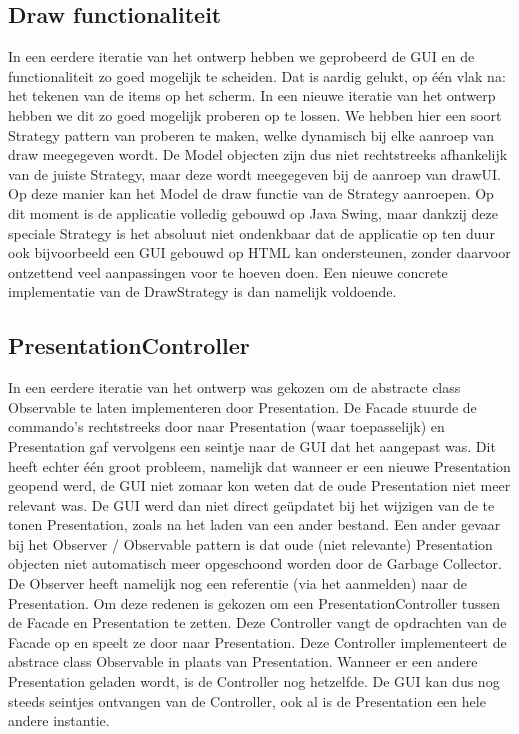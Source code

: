 \documentclass[a4paper]{article}
\newcommand{\1}[0]{\'{e}\'{e}n}
\begin{document}
\subsection{Draw functionaliteit}
\label{sub:drawFunc}
In een eerdere iteratie van het ontwerp hebben we geprobeerd de GUI en de functionaliteit zo goed mogelijk te scheiden. Dat is aardig gelukt, op \1 vlak na: het tekenen van de items op het scherm. In een nieuwe iteratie van het ontwerp hebben we dit zo goed mogelijk proberen op te lossen. We hebben hier een soort Strategy pattern van proberen te maken, welke dynamisch bij elke aanroep van draw meegegeven wordt. De Model objecten zijn dus niet rechtstreeks afhankelijk van de juiste Strategy, maar deze wordt meegegeven bij de aanroep van drawUI. Op deze manier kan het Model de draw functie van de Strategy aanroepen. Op dit moment is de applicatie volledig gebouwd op Java Swing, maar dankzij deze speciale Strategy is het absoluut niet ondenkbaar dat de applicatie op ten duur ook bijvoorbeeld een GUI gebouwd op HTML kan ondersteunen, zonder daarvoor ontzettend veel aanpassingen voor te hoeven doen. Een nieuwe concrete implementatie van de DrawStrategy is dan namelijk voldoende.

\subsection{PresentationController}
\label{sub:presCntrllr}
In een eerdere iteratie van het ontwerp was gekozen om de abstracte class Observable te laten implementeren door Presentation. De Facade stuurde de commando's rechtstreeks door naar Presentation (waar toepasselijk) en Presentation gaf vervolgens een seintje naar de GUI dat het aangepast was. Dit heeft echter \1 groot probleem, namelijk dat wanneer er een nieuwe Presentation geopend werd, de GUI niet zomaar kon weten dat de oude Presentation niet meer relevant was. De GUI werd dan niet direct ge\"{u}pdatet bij het wijzigen van de te tonen Presentation, zoals na het laden van een ander bestand. Een ander gevaar bij het Observer / Observable pattern is dat oude (niet relevante) Presentation objecten niet automatisch meer opgeschoond worden door de Garbage Collector. De Observer heeft namelijk nog een referentie (via het aanmelden) naar de Presentation. Om deze redenen is gekozen om een PresentationController tussen de Facade en Presentation te zetten. Deze Controller vangt de opdrachten van de Facade op en speelt ze door naar Presentation. Deze Controller implementeert de abstrace class Observable in plaats van Presentation. Wanneer er een andere Presentation geladen wordt, is de Controller nog hetzelfde. De GUI kan dus nog steeds seintjes ontvangen van de Controller, ook al is de Presentation een hele andere instantie.
\end{document}
